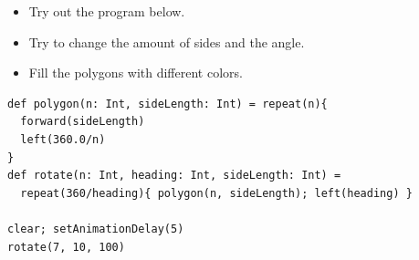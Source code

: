 \begin{itemize}

\item {Try out the program below.}
\item {Try to change the amount of sides and the angle.}
\item {Fill the polygons with different colors.}

\end{itemize}



  

\begin{lstlisting}[basicstyle={\ttfamily\fontsize{16}{19}\selectfont},numbers=none]
def polygon(n: Int, sideLength: Int) = repeat(n){
  forward(sideLength)
  left(360.0/n)
}
def rotate(n: Int, heading: Int, sideLength: Int) = 
  repeat(360/heading){ polygon(n, sideLength); left(heading) }

clear; setAnimationDelay(5)
rotate(7, 10, 100)
\end{lstlisting}
        
